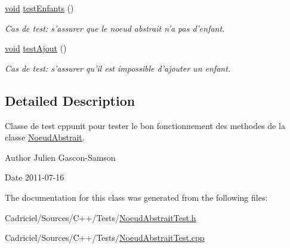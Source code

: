 \begin{DoxyCompactItemize}
\hyperlink{wglew_8h_aeea6e3dfae3acf232096f57d2d57f084}{void} \hyperlink{group__inf2990_ga0e65b00620e79646a9efd8a93c4fc650}{test\-Enfants} ()
\begin{DoxyCompactList}\small\item\em Cas de test\-: s'assurer que le noeud abstrait n'a pas d'enfant. \end{DoxyCompactList}\item 
\hyperlink{wglew_8h_aeea6e3dfae3acf232096f57d2d57f084}{void} \hyperlink{group__inf2990_ga0c8ab22a0e11160d54a82529dcbd41d5}{test\-Ajout} ()
\begin{DoxyCompactList}\small\item\em Cas de test\-: s'assurer qu'il est impossible d'ajouter un enfant. \end{DoxyCompactList}\end{DoxyCompactItemize}


\subsection{Detailed Description}
Classe de test cppunit pour tester le bon fonctionnement des methodes de la classe \hyperlink{class_noeud_abstrait}{Noeud\-Abstrait}. 

\begin{DoxyAuthor}{Author}
Julien Gascon-\/\-Samson 
\end{DoxyAuthor}
\begin{DoxyDate}{Date}
2011-\/07-\/16 
\end{DoxyDate}


The documentation for this class was generated from the following files\-:\begin{DoxyCompactItemize}
\item 
Cadriciel/\-Sources/\-C++/\-Tests/\hyperlink{_noeud_abstrait_test_8h}{Noeud\-Abstrait\-Test.\-h}\item 
Cadriciel/\-Sources/\-C++/\-Tests/\hyperlink{_noeud_abstrait_test_8cpp}{Noeud\-Abstrait\-Test.\-cpp}\end{DoxyCompactItemize}
